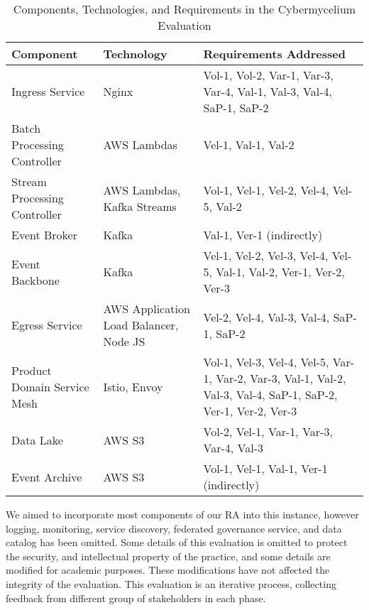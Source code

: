 \documentclass[review]{elsarticle}
\begin{document}
\begin{table}
    \centering
    \begin{tabular}{|p{3.5cm}|p{3cm}|p{5cm}|}
    \hline
    \textbf{Component} & \textbf{Technology} & \textbf{Requirements Addressed} \\
    \hline
    Ingress Service & Nginx & Vol-1, Vol-2, Var-1, Var-3, Var-4, Val-1, Val-3, Val-4, SaP-1, SaP-2 \\
    \hline
    Batch Processing Controller & AWS Lambdas & Vel-1, Val-1, Val-2 \\
    \hline
    Stream Processing Controller & AWS Lambdas, Kafka Streams & Vol-1, Vel-1, Vel-2, Vel-4, Vel-5, Val-2 \\
    \hline
    Event Broker & Kafka & Val-1, Ver-1 (indirectly) \\
    \hline
    Event Backbone & Kafka & Vel-1, Vel-2, Vel-3, Vel-4, Vel-5, Val-1, Val-2, Ver-1, Ver-2, Ver-3 \\
    \hline
    Egress Service & AWS Application Load Balancer, Node JS & Vel-2, Vel-4, Val-3, Val-4, SaP-1, SaP-2 \\
    \hline
    Product Domain Service Mesh & Istio, Envoy & Vol-1, Vel-3, Vel-4, Vel-5, Var-1, Var-2, Var-3, Val-1, Val-2, Val-3, Val-4, SaP-1, SaP-2, Ver-1, Ver-2, Ver-3 \\
    \hline
    Data Lake & AWS S3 & Vol-2, Vel-1, Var-1, Var-3, Var-4, Val-3 \\
    \hline
    Event Archive & AWS S3 & Vol-1, Vel-1, Val-1, Ver-1 (indirectly) \\
    \hline
    \end{tabular}
    \caption{Components, Technologies, and Requirements in the Cybermycelium Evaluation}
    \label{tab:components-tech-req}
\end{table}


We aimed to incorporate most components of our RA into this instance, however logging, monitoring, service discovery, federated governance service, and data catalog has been omitted. Some details of this evaluation is omitted to protect the security, and intellectual property of the practice, and some details are modified for academic purposes. These modifications have not affected the integrity of the evaluation. This evaluation is an iterative process, collecting feedback from different group of stakeholders in each phase. 
\end{document}
